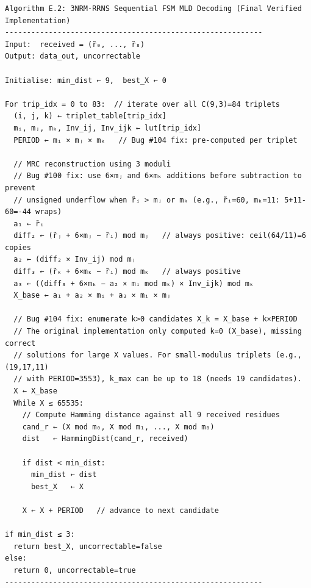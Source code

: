 \documentclass[
  12pt,
  a4paper]{report}
\begin{document}
\begin{verbatim}
Algorithm E.2: 3NRM-RRNS Sequential FSM MLD Decoding (Final Verified Implementation)
-----------------------------------------------------------
Input:  received = (r̃₀, ..., r̃₈)
Output: data_out, uncorrectable

Initialise: min_dist ← 9,  best_X ← 0

For trip_idx = 0 to 83:  // iterate over all C(9,3)=84 triplets
  (i, j, k) ← triplet_table[trip_idx]
  mᵢ, mⱼ, mₖ, Inv_ij, Inv_ijk ← lut[trip_idx]
  PERIOD ← mᵢ × mⱼ × mₖ   // Bug #104 fix: pre-computed per triplet

  // MRC reconstruction using 3 moduli
  // Bug #100 fix: use 6×mⱼ and 6×mₖ additions before subtraction to prevent
  // unsigned underflow when r̃ᵢ > mⱼ or mₖ (e.g., r̃ᵢ=60, mₖ=11: 5+11-60=-44 wraps)
  a₁ ← r̃ᵢ
  diff₂ ← (r̃ⱼ + 6×mⱼ − r̃ᵢ) mod mⱼ   // always positive: ceil(64/11)=6 copies
  a₂ ← (diff₂ × Inv_ij) mod mⱼ
  diff₃ ← (r̃ₖ + 6×mₖ − r̃ᵢ) mod mₖ   // always positive
  a₃ ← ((diff₃ + 6×mₖ − a₂ × mᵢ mod mₖ) × Inv_ijk) mod mₖ
  X_base ← a₁ + a₂ × mᵢ + a₃ × mᵢ × mⱼ

  // Bug #104 fix: enumerate k>0 candidates X_k = X_base + k×PERIOD
  // The original implementation only computed k=0 (X_base), missing correct
  // solutions for large X values. For small-modulus triplets (e.g., (19,17,11)
  // with PERIOD=3553), k_max can be up to 18 (needs 19 candidates).
  X ← X_base
  While X ≤ 65535:
    // Compute Hamming distance against all 9 received residues
    cand_r ← (X mod m₀, X mod m₁, ..., X mod m₈)
    dist   ← HammingDist(cand_r, received)

    if dist < min_dist:
      min_dist ← dist
      best_X   ← X

    X ← X + PERIOD   // advance to next candidate

if min_dist ≤ 3:
  return best_X, uncorrectable=false
else:
  return 0, uncorrectable=true
-----------------------------------------------------------
\end{verbatim}
\end{document}
